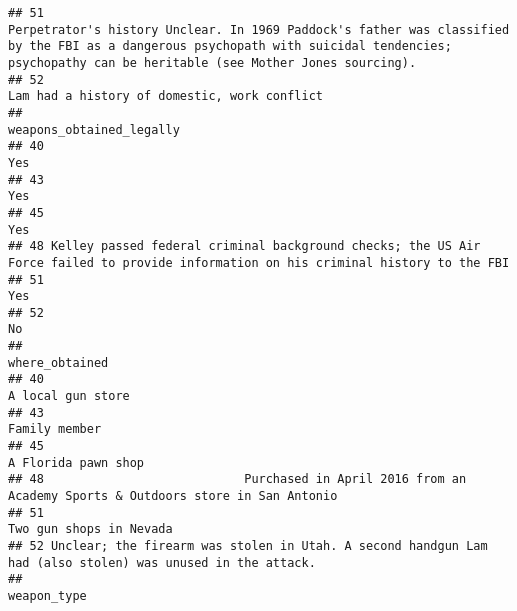 \documentclass[
]{article}
\begin{document}
\begin{verbatim}
## 51                                                                                                                                                                                        Perpetrator's history Unclear. In 1969 Paddock's father was classified by the FBI as a dangerous psychopath with suicidal tendencies; psychopathy can be heritable (see Mother Jones sourcing). 
## 52                                                                                                                                                                                                                                                                                                                                            Lam had a history of domestic, work conflict
##                                                                                                               weapons_obtained_legally
## 40                                                                                                                                 Yes
## 43                                                                                                                                 Yes
## 45                                                                                                                                 Yes
## 48 Kelley passed federal criminal background checks; the US Air Force failed to provide information on his criminal history to the FBI
## 51                                                                                                                                 Yes
## 52                                                                                                                                  No
##                                                                                               where_obtained
## 40                                                                                         A local gun store
## 43                                                                                             Family member
## 45                                                                                       A Florida pawn shop
## 48                            Purchased in April 2016 from an Academy Sports & Outdoors store in San Antonio
## 51                                                                                   Two gun shops in Nevada
## 52 Unclear; the firearm was stolen in Utah. A second handgun Lam had (also stolen) was unused in the attack.
##                                                                                                                 weapon_type

\end{verbatim}
\end{document}
